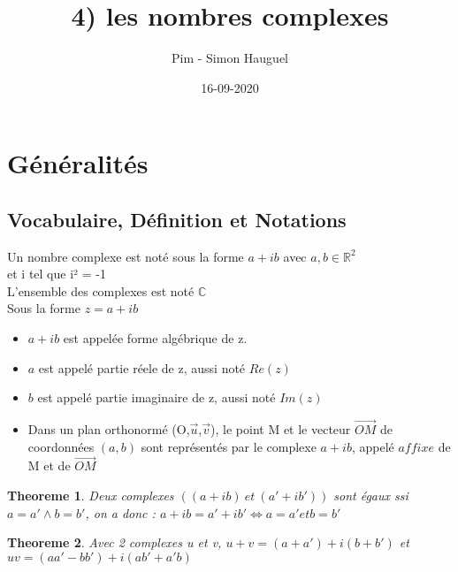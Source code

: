 \documentclass{article}
\title{4) les nombres complexes}
\author{Pim - Simon Hauguel}
\date{16-09-2020}
\newtheorem{theorem}{Theoreme}
\begin{document}
\maketitle

\section{Généralités}

\subsection{Vocabulaire, Définition et Notations}

Un nombre complexe est noté sous la forme $a + ib$ avec $a,b \in \mathbb{R}^{2}$\\ et i tel que i² = -1\\
L'ensemble des complexes est noté $\mathbb{C}$\\
Sous la forme $z = a + ib$
\begin{itemize}
  \item $a + ib$ est appelée forme algébrique de z.
  \item $a$ est appelé partie réele de z, aussi noté $Re(z)$
  \item $b$ est appelé partie imaginaire de z, aussi noté $Im(z)$
  \item Dans un plan orthonormé (O,$\vec{u}$,$\vec{v}$), le point M et le vecteur $\vec{OM}$ de coordonnées $(a,b)$ sont représentés par le complexe $a + ib$, appelé $affixe$ de M et de $\vec{OM}$
\end{itemize}

\begin{theorem}
  Deux complexes $((a + ib)~et~(a' + ib'))$ sont égaux ssi $a = a' \land b = b'$, on a donc : $a + ib = a' + ib' \Leftrightarrow a = a' et b = b'$
\end{theorem}
\begin{theorem}
  Avec 2 complexes u et v, $u + v = (a + a') + i(b + b')$ et $uv = (aa' - bb') + i(ab' + a'b)$
\end{theorem}
\end{document}
